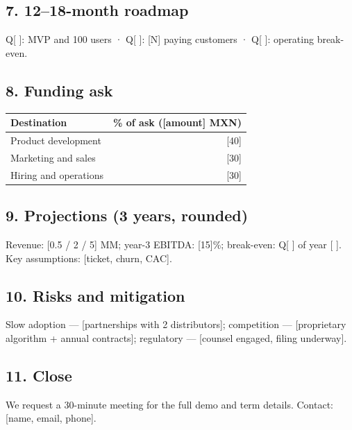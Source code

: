 \documentclass[11pt]{article}
\begin{document}
\subsection*{7. 12–18-month roadmap}
Q[ ]: MVP and 100 users · Q[ ]: [N] paying customers · Q[ ]: operating
break-even.

\subsection*{8. Funding ask}
\begin{center}
\begin{tabular}{lr}
  \toprule
  Destination & \% of ask ([amount] MXN) \\
  \midrule
  Product development & [40] \\
  Marketing and sales & [30] \\
  Hiring and operations & [30] \\
  \bottomrule
\end{tabular}
\end{center}

\subsection*{9. Projections (3 years, rounded)}
Revenue: [0.5 / 2 / 5] MM; year-3 EBITDA: [15]\%; break-even: Q[ ] of
year [ ]. Key assumptions: [ticket, churn, CAC].

\subsection*{10. Risks and mitigation}
Slow adoption — [partnerships with 2 distributors]; competition —
[proprietary algorithm + annual contracts]; regulatory — [counsel engaged,
filing underway].

\subsection*{11. Close}
We request a 30-minute meeting for the full demo and term details.
Contact: [name, email, phone].
\end{document}
